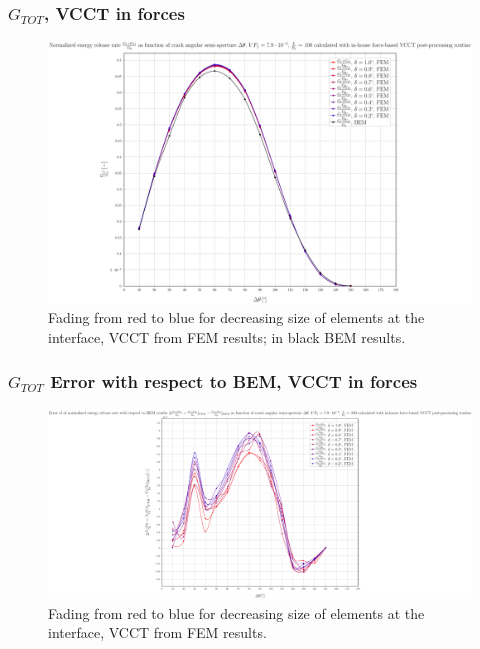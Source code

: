 \documentclass[first,firstsupp,lastsupp,handout,last,hyperref,table]{ETHclass}
\begin{document}
\begin{frame}
\frametitle{\small $G_{TOT}$, VCCT in forces}
\vspace{-0.5cm}
\centering
\captionsetup[figure]{font=scriptsize,labelfont=scriptsize}
\begin{figure}[!h]
\centering
\includegraphics[height=0.7\textheight]{2017-07-10_AbqRunSummary_SmallStrain_M-F-VCCT_GTOT.pdf}
  \caption{\scriptsize Fading from red to blue for decreasing size of elements at the interface, VCCT from FEM results; in black BEM results.}
  \label{fig:res1}
\end{figure}
\end{frame}

\begin{frame}
\frametitle{\small $G_{TOT}$ Error with respect to BEM, VCCT in forces}
\vspace{-0.5cm}
\centering
\captionsetup[figure]{font=scriptsize,labelfont=scriptsize}
\begin{figure}[!h]
\centering
\includegraphics[height=0.7\textheight]{2017-07-10_AbqRunSummary_SmallStrain_M-F-VCCT_GTOT_ERR.pdf}
  \caption{\scriptsize Fading from red to blue for decreasing size of elements at the interface, VCCT from FEM results.}
  \label{fig:res1}
\end{figure}
\end{frame}
\end{document}
